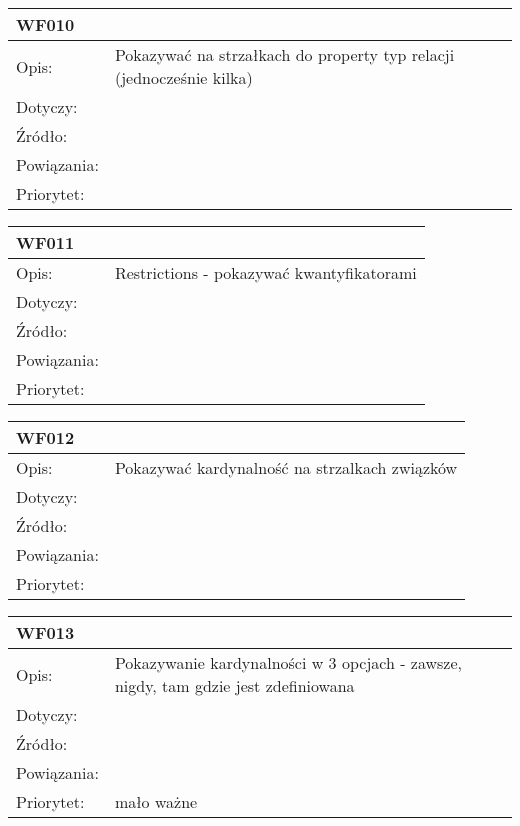 \documentclass[a4paper,10pt]{article}
\begin{document}
\begin{tabular}{|p{3cm}|p{9cm}|} \hline

WF010 &  \\ \hline
Opis: &   Pokazywać na strzałkach do property typ relacji (jednocześnie kilka)  \\ \hline
Dotyczy: &  \\ \hline
Źródło: &  \\ \hline
Powiązania: & \\ \hline
Priorytet: &  \\ \hline

\end{tabular}


\begin{tabular}{|p{3cm}|p{9cm}|} \hline

WF011 &  \\ \hline
Opis: &   Restrictions - pokazywać kwantyfikatorami  \\ \hline
Dotyczy: &  \\ \hline
Źródło: &  \\ \hline
Powiązania: & \\ \hline
Priorytet: &  \\ \hline

\end{tabular}


\begin{tabular}{|p{3cm}|p{9cm}|} \hline

WF012 &  \\ \hline
Opis: &   Pokazywać kardynalność na strzalkach związków \\ \hline
Dotyczy: &  \\ \hline
Źródło: &  \\ \hline
Powiązania: & \\ \hline
Priorytet: &  \\ \hline

\end{tabular}

\begin{tabular}{|p{3cm}|p{9cm}|} \hline

WF013 &  \\ \hline
Opis: &   Pokazywanie kardynalności w 3 opcjach - zawsze, nigdy, tam gdzie jest zdefiniowana  \\ \hline
Dotyczy: &  \\ \hline
Źródło: &  \\ \hline
Powiązania: & \\ \hline
Priorytet: & mało ważne  \\ \hline

\end{tabular}
\end{document}
